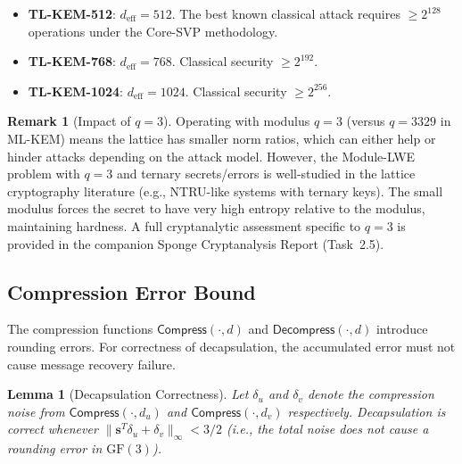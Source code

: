 \documentclass[11pt,a4paper]{article}
\newtheorem{lemma}[theorem]{Lemma}
\theoremstyle{definition}
\newtheorem{remark}[theorem]{Remark}
\newcommand{\GF}{\mathrm{GF}(3)}
\begin{document}
\begin{itemize}[leftmargin=2em]
  \item \textbf{TL-KEM-512}: $d_{\text{eff}} = 512$. The best known classical attack requires $\geq 2^{128}$ operations under the Core-SVP methodology.
  \item \textbf{TL-KEM-768}: $d_{\text{eff}} = 768$. Classical security $\geq 2^{192}$.
  \item \textbf{TL-KEM-1024}: $d_{\text{eff}} = 1024$. Classical security $\geq 2^{256}$.
\end{itemize}

\begin{remark}[Impact of $q=3$]
Operating with modulus $q=3$ (versus $q=3329$ in ML-KEM) means the lattice has smaller norm ratios, which can either help or hinder attacks depending on the attack model. However, the Module-LWE problem with $q=3$ and ternary secrets/errors is well-studied in the lattice cryptography literature (e.g., NTRU-like systems with ternary keys). The small modulus forces the secret to have very high entropy relative to the modulus, maintaining hardness. A full cryptanalytic assessment specific to $q=3$ is provided in the companion Sponge Cryptanalysis Report (Task~2.5).
\end{remark}

\subsection{Compression Error Bound}

The compression functions $\textsf{Compress}(\cdot, d)$ and $\textsf{Decompress}(\cdot, d)$ introduce rounding errors. For correctness of decapsulation, the accumulated error must not cause message recovery failure.

\begin{lemma}[Decapsulation Correctness]
\label{lem:correct}
Let $\delta_u$ and $\delta_v$ denote the compression noise from $\textsf{Compress}(\cdot, d_u)$ and $\textsf{Compress}(\cdot, d_v)$ respectively. Decapsulation is correct whenever $\|\mathbf{s}^T \delta_u + \delta_v\|_\infty < 3/2$ (i.e., the total noise does not cause a rounding error in $\GF$).
\end{lemma}
\end{document}

